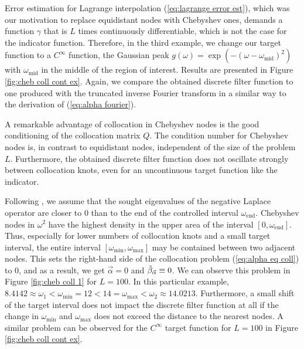 \documentclass[a4paper,11pt,bibliography=totoc,listof=totoc,headinclude=true,cleardoublepage=empty,oneside]{scrbook}
\newcommand{\dffv}{\Tilde{\beta}_{\Vec{\alpha}}}
\newcommand{\e}{\mathrm{end}}
\renewcommand{\eqref}[1]{(\ref{#1})}
\begin{document}
\newpage
Error estimation for Lagrange interpolation \eqref{eq:lagrange error est}, which was our motivation to replace equidistant nodes with Chebyshev ones, demands a function $\gamma$ that is $L$ times continuously differentiable, which is not the case for the indicator function. Therefore, in the third example, we change our target function to a $C^\infty$ function, the Gaussian peak $g(\omega) = \exp\left(-(\omega-\omega_{\mathrm{mid}})^2\right)$ with $\omega_{\mathrm{mid}}$ in the middle of the region of interest. Results are presented in Figure \ref{fig:cheb coll cont ex}. Again, we compare the obtained discrete filter function to one produced with the truncated inverse Fourier transform in a similar way to the derivation of \eqref{eq:alpha fourier}.

A remarkable advantage of collocation in Chebyshev nodes is the good conditioning of the collocation matrix $Q$. The condition number for Chebyshev nodes is, in contrast to equidistant nodes, independent of the size of the problem $L$. Furthermore, the obtained discrete filter function does not oscillate strongly between collocation knots, even for an uncontinuous target function like the indicator.

Following \cite{nannen}, we assume that the sought eigenvalues of the negative Laplace operator are closer to 0 than to the end of the controlled interval $\omega_\e$. Chebyshev nodes in $\omega^2$ have the highest density in the upper area of the interval $[0, \omega_\e]$. Thus, especially for lower numbers of collocation knots and a small target interval, the entire interval $\left[\omega_{\min}, \omega_{\max} \right]$ may be contained between two adjacent nodes. This sets the right-hand side of the collocation problem \eqref{eq:alpha eq coll} to 0, and as a result, we get $\Vec{\alpha}=0$ and $\dffv \equiv 0$. We can observe this problem in Figure \ref{fig:cheb coll 1} for $L=100$. In this particular example, $ 8.4142\approx\omega_1 < \omega_{\min} = 12 < 14 = \omega_{\max} < \omega_2 \approx 14.0213 $. Furthermore, a small shift of the target interval does not impact the discrete filter function at all if the change in $\omega_{\min}$ and $\omega_{\max}$ does not exceed the distance to the nearest nodes. A similar problem can be observed for the $C^\infty$ target function for $L=100$ in Figure \ref{fig:cheb coll cont ex}.
\end{document}
